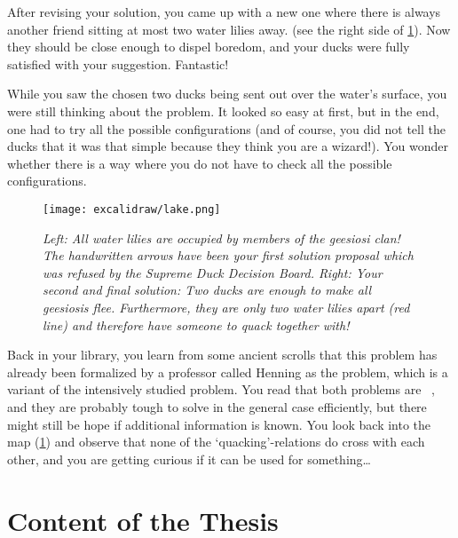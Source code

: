 After revising your solution, you came up with a new one where there is always another friend sitting at most two water lilies away. (see the right side of \cref{fig:duck-lake}). 
Now they should be close enough to dispel boredom, and your ducks were fully satisfied with your suggestion. 
Fantastic!

While you saw the chosen two ducks being sent out over the water's surface, you were still thinking about the problem.
It looked so easy at first, but in the end, one had to try all the possible configurations (and of course, you did not tell the ducks that it was that simple because they think you are a wizard!).
You wonder whether there is a way where you do not have to check all the possible configurations.

\begin{figure}[t]
    \centering
    \texttt{[image: excalidraw/lake.png]}
    \caption[Introductions: Merganser Lake. Own Drawing. Embedded icons under public domain from {\href{https://creazilla.com/}{https://creazilla.com/}}]{\textit{Left: All water lilies are occupied by members of the \textit{geesiosi} clan! The handwritten arrows have been your first solution proposal which was refused by the \textit{Supreme Duck Decision Board}.
    Right: Your second and final solution: Two ducks are enough to make all \textit{geesiosi}s flee. Furthermore, they are only two water lilies apart (red line) and therefore have someone to quack together with!}}
    \label{fig:duck-lake}
\end{figure}

Back in your library, you learn from some ancient scrolls that this problem has already been formalized by a professor called Henning \cite{Henning2019} as the \sdom problem, which is a variant of the intensively studied \dom problem. 
You read that both problems are \NPc~\cite{Garey1979,Henning2019}, and they are probably tough to solve in the general case efficiently, but there might still be hope if additional information is known. 
You look back into the map (\cref{fig:duck-lake}) and observe that none of the `quacking'-relations do cross with each other, and you are getting curious if it can be used for something\ldots

\section{Content of the Thesis}

